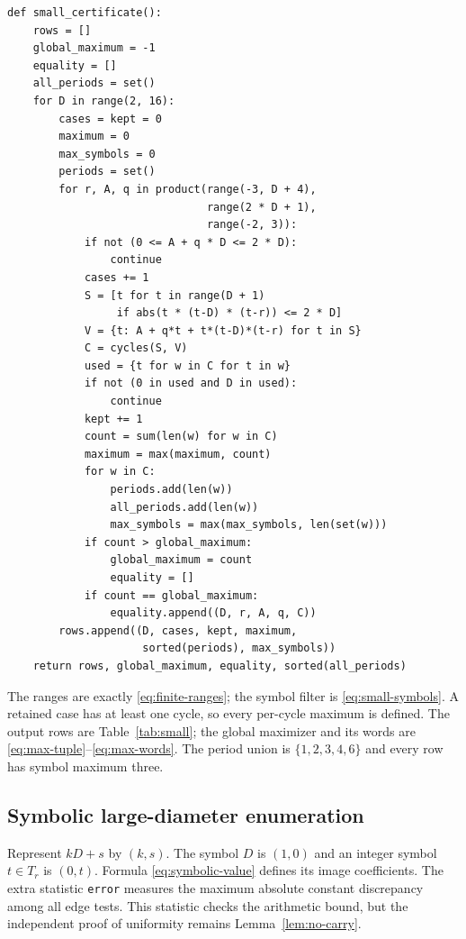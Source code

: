 \begin{Verbatim}[fontsize=\footnotesize]
def small_certificate():
    rows = []
    global_maximum = -1
    equality = []
    all_periods = set()
    for D in range(2, 16):
        cases = kept = 0
        maximum = 0
        max_symbols = 0
        periods = set()
        for r, A, q in product(range(-3, D + 4),
                               range(2 * D + 1),
                               range(-2, 3)):
            if not (0 <= A + q * D <= 2 * D):
                continue
            cases += 1
            S = [t for t in range(D + 1)
                 if abs(t * (t-D) * (t-r)) <= 2 * D]
            V = {t: A + q*t + t*(t-D)*(t-r) for t in S}
            C = cycles(S, V)
            used = {t for w in C for t in w}
            if not (0 in used and D in used):
                continue
            kept += 1
            count = sum(len(w) for w in C)
            maximum = max(maximum, count)
            for w in C:
                periods.add(len(w))
                all_periods.add(len(w))
                max_symbols = max(max_symbols, len(set(w)))
            if count > global_maximum:
                global_maximum = count
                equality = []
            if count == global_maximum:
                equality.append((D, r, A, q, C))
        rows.append((D, cases, kept, maximum,
                     sorted(periods), max_symbols))
    return rows, global_maximum, equality, sorted(all_periods)
\end{Verbatim}

The ranges are exactly \eqref{eq:finite-ranges}; the symbol filter
is \eqref{eq:small-symbols}. A retained case has at least one cycle,
so every per-cycle maximum is defined. The output rows are
Table~\ref{tab:small}; the global maximizer and its words are
\eqref{eq:max-tuple}--\eqref{eq:max-words}. The period union is
$\{1,2,3,4,6\}$ and every row has symbol maximum three.

\subsection{Symbolic large-diameter enumeration}

Represent $kD+s$ by $(k,s)$. The symbol $D$ is $(1,0)$ and an
integer symbol $t\in T_r$ is $(0,t)$. Formula
\eqref{eq:symbolic-value} defines its image coefficients.
The extra statistic \texttt{error} measures the maximum absolute
constant discrepancy among all edge tests. This statistic checks
the arithmetic bound, but the independent proof of uniformity
remains Lemma~\ref{lem:no-carry}.

